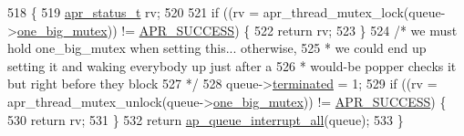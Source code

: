 \begin{DoxyCode}
518 \{
519     \hyperlink{group__apr__errno_gaa5105fa83cc322f09382292db8b47593}{apr\_status\_t} rv;
520 
521     \textcolor{keywordflow}{if} ((rv = apr\_thread\_mutex\_lock(queue->\hyperlink{structfd__queue__t_af029904f6cc5ddc0afec5df2fadeaef6}{one\_big\_mutex})) != 
      \hyperlink{group__apr__errno_ga9ee311b7bf1c691dc521d721339ee2a6}{APR\_SUCCESS}) \{
522         \textcolor{keywordflow}{return} rv;
523     \}
524     \textcolor{comment}{/* we must hold one\_big\_mutex when setting this... otherwise,}
525 \textcolor{comment}{     * we could end up setting it and waking everybody up just after a}
526 \textcolor{comment}{     * would-be popper checks it but right before they block}
527 \textcolor{comment}{     */}
528     queue->\hyperlink{structfd__queue__t_aace4fa4b984ffe25980fed75c97779d2}{terminated} = 1;
529     \textcolor{keywordflow}{if} ((rv = apr\_thread\_mutex\_unlock(queue->\hyperlink{structfd__queue__t_af029904f6cc5ddc0afec5df2fadeaef6}{one\_big\_mutex})) != 
      \hyperlink{group__apr__errno_ga9ee311b7bf1c691dc521d721339ee2a6}{APR\_SUCCESS}) \{
530         \textcolor{keywordflow}{return} rv;
531     \}
532     \textcolor{keywordflow}{return} \hyperlink{group__APACHE__MPM__EVENT_ga6a9df0d76a287d52f8ea78b6ebce9c27}{ap\_queue\_interrupt\_all}(queue);
533 \}
\end{DoxyCode}
